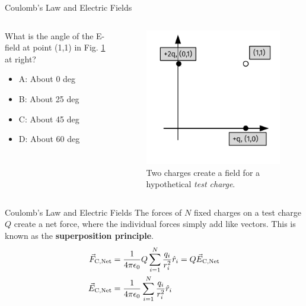 \documentclass{beamer}
\begin{document}
\begin{frame}{Coulomb’s Law and Electric Fields}
\small
\begin{columns}[T]
\begin{column}{0.5\textwidth}
What is the angle of the E-field at point (1,1) in Fig. \ref{fig:netfield3} at right?
\begin{itemize}
\item A: About 0 deg
\item B: About 25 deg
\item C: About 45 deg
\item D: About 60 deg
\end{itemize}
\end{column}
\begin{column}{0.5\textwidth}
\begin{figure}
\includegraphics[width=\textwidth]{figures/NetField3.pdf}
\caption{\label{fig:netfield3} Two charges create a field for a hypothetical \textit{test charge}.}
\end{figure}
\end{column}
\end{columns}
\end{frame}

\begin{frame}{Coulomb’s Law and Electric Fields}
The forces of $N$ fixed charges on a test charge $Q$ create a net force, where the individual forces simply add like vectors.  This is known as the \textbf{superposition principle}.
\begin{align}
\vec{F}_{\rm C,Net} &= \frac{1}{4\pi\epsilon_{\rm 0}} Q \sum_{i = 1}^N \frac{q_i}{r_i^2}\hat{r}_i = Q \vec{E}_{\rm C,Net} \\
\vec{E}_{\rm C,Net} &= \frac{1}{4\pi\epsilon_{\rm 0}} \sum_{i = 1}^N \frac{q_i}{r_i^2}\hat{r}_i
\end{align}
\end{frame}
\end{document}
